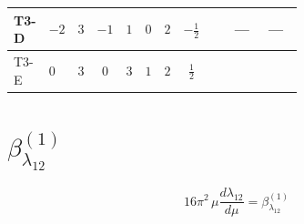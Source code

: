 \documentclass[8pt]{article}
\begin{document}
\begin{landscape}
\begin{longtable}{@{}llcccccc >{\raggedright\arraybackslash}p{0.21\linewidth} >{\raggedright\arraybackslash}p{0.21\linewidth} >{\raggedright\arraybackslash}p{0.21\linewidth}@{}}
\midrule
T3-D & $-2$ & $3$ & $-1$ & $1$ & $0$ & $2$ & $-\frac{1}{2}$ & \scriptsize\adjustbox{max width=\linewidth}{$\begin{gathered} -\frac{3 {g_Y}^2 {\lambda_{H2}}}{2}\end{gathered}$} & --- & --- \\
\midrule
T3-E & $0$ & $3$ & $0$ & $3$ & $1$ & $2$ & $\frac{1}{2}$ & \scriptsize\adjustbox{max width=\linewidth}{$\begin{gathered} -\frac{15 {g_Y}^2 {\lambda_{H2}}}{2}\end{gathered}$} & \scriptsize\adjustbox{max width=\linewidth}{$\begin{gathered} +6 {\lambda_{H2}^{\rm Adj}}^2\end{gathered}$} & \scriptsize\adjustbox{max width=\linewidth}{$\begin{gathered} +{\lambda_{H1}} (6 {\lambda_{12}}+4 {\lambda_{12}^{\rm Cross}})\end{gathered}$} \\
\midrule
\bottomrule
\end{longtable}
\clearpage
\section*{$\beta_{\lambda_{12}}^{(1)}$}
\[16\pi^2\,\mu\frac{d \lambda_{12}}{d\mu}=\beta_{\lambda_{12}}^{(1)}\]

\end{landscape}
\end{document}
